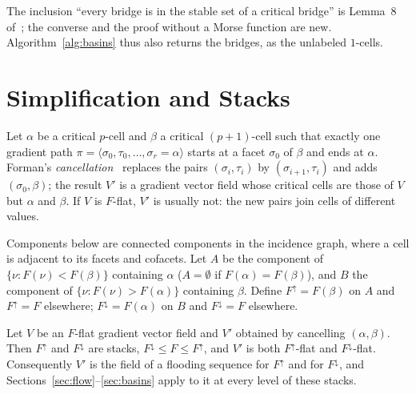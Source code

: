 \documentclass[runningheads]{llncs}
\newcommand{\Fup}{F^{\uparrow}}
\newcommand{\Fdown}{F^{\downarrow}}
\begin{document}
The inclusion ``every bridge is in the stable set of a critical bridge'' is
Lemma~8 of~\cite{DFRS15}; the converse and the proof without a Morse
function are new. Algorithm~\ref{alg:basins} thus also returns the bridges,
as the unlabeled $1$-cells.

\section{Simplification and Stacks}\label{sec:simplification}

Let $\alpha$ be a critical $p$-cell and $\beta$ a critical $(p+1)$-cell such
that exactly one gradient path
$\pi=\langle\sigma_0,\tau_0,\ldots,\sigma_r=\alpha\rangle$ starts at a facet
$\sigma_0$ of $\beta$ and ends at $\alpha$. Forman's
\emph{cancellation}~\cite[Sect.~11]{Forman98} replaces the pairs
$(\sigma_i,\tau_i)$ by $(\sigma_{i+1},\tau_i)$ and adds $(\sigma_0,\beta)$;
the result $V'$ is a gradient vector field whose critical cells are those
of $V$ but $\alpha$ and $\beta$. If $V$ is $F$-flat, $V'$ is usually not:
the new pairs join cells of different values.

Components below are connected components in the incidence graph, where a
cell is adjacent to its facets and cofacets. Let $A$ be the component of
$\{\nu:F(\nu)<F(\beta)\}$ containing $\alpha$ ($A=\emptyset$ if
$F(\alpha)=F(\beta)$), and $B$ the component of $\{\nu:F(\nu)>F(\alpha)\}$
containing $\beta$. Define $\Fup=F(\beta)$ on $A$ and $\Fup=F$ elsewhere;
$\Fdown=F(\alpha)$ on $B$ and $\Fdown=F$ elsewhere.

\begin{theorem}\label{thm:cancel}
Let $V$ be an $F$-flat gradient vector field and $V'$ obtained by
cancelling $(\alpha,\beta)$. Then $\Fup$ and $\Fdown$ are stacks,
$\Fdown\le F\le\Fup$, and $V'$ is both $\Fup$-flat and $\Fdown$-flat.
Consequently $V'$ is the field of a flooding sequence for $\Fup$ and for
$\Fdown$, and Sections~\ref{sec:flow}--\ref{sec:basins} apply to it at every
level of these stacks.
\end{theorem}
\end{document}
